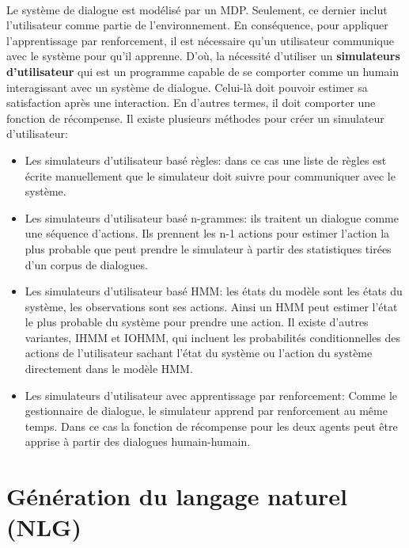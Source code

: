 \paragraph{}
Le système de dialogue est modélisé par un MDP. Seulement, ce dernier inclut l’utilisateur comme partie de l’environnement. En conséquence, pour appliquer l’apprentissage par renforcement, il est nécessaire qu’un utilisateur communique avec le système pour qu’il apprenne. D’où, la nécessité d’utiliser un \textbf{simulateurs d’utilisateur}\label{usersim} qui est un programme capable de se comporter comme un humain interagissant avec un système de dialogue. Celui-là doit pouvoir estimer sa satisfaction après une interaction. En d’autres termes, il doit comporter une fonction de récompense. Il existe plusieurs méthodes pour créer un simulateur d’utilisateur:
\begin{itemize}
	\item Les simulateurs d’utilisateur basé règles: dans ce cas une liste de règles est écrite manuellement que le simulateur doit suivre pour communiquer avec le système\cite{Schatzmann2007}.
	\item Les simulateurs d’utilisateur basé n-grammes: ils traitent un dialogue comme une séquence d’actions. Ils prennent les n-1 actions pour estimer l’action la plus probable que peut prendre le simulateur à partir des statistiques tirées d'un	 corpus de dialogues\cite{Georgila2005}.
	\item Les simulateurs d’utilisateur basé HMM: les états du modèle sont les états du système, les observations sont ses actions. Ainsi un HMM peut estimer l’état le plus probable du système pour prendre une action. Il existe d’autres variantes, IHMM et IOHMM, qui incluent les probabilités conditionnelles des actions de l'utilisateur sachant l’état du système ou l’action du système directement dans le modèle HMM\cite{Cuayhuitl2005}.
	\item Les simulateurs d’utilisateur avec apprentissage par renforcement: Comme le gestionnaire de dialogue, le simulateur apprend par renforcement au même temps. Dans ce cas la fonction de récompense pour les deux agents peut être apprise à partir des dialogues humain-humain\cite{Chandramohan2011}.
\end{itemize}







\section{Génération du langage naturel (NLG)}\label{NLG}
